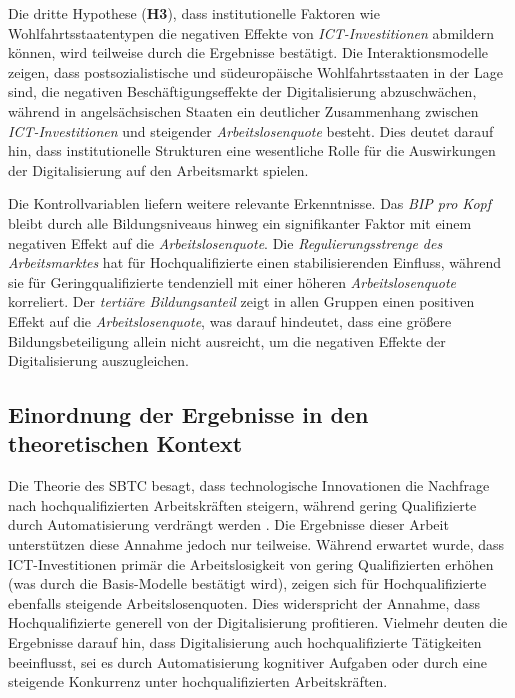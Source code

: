 Die dritte Hypothese (\textbf{H3}), dass institutionelle Faktoren wie Wohlfahrtsstaatentypen die 
negativen Effekte von \textit{\ac{ICT}-Investitionen} abmildern können, wird teilweise durch die 
Ergebnisse bestätigt. Die Interaktionsmodelle zeigen, dass postsozialistische und südeuropäische 
Wohlfahrtsstaaten in der Lage sind, die negativen Beschäftigungseffekte der Digitalisierung 
abzuschwächen, während in angelsächsischen Staaten ein deutlicher Zusammenhang zwischen 
\textit{\ac{ICT}-Investitionen} und steigender \textit{Arbeitslosenquote} besteht. Dies deutet 
darauf hin, dass institutionelle Strukturen eine wesentliche Rolle für die Auswirkungen der 
Digitalisierung auf den Arbeitsmarkt spielen.

Die Kontrollvariablen liefern weitere relevante Erkenntnisse. Das \textit{\ac{BIP} pro Kopf} 
bleibt durch alle Bildungsniveaus hinweg ein signifikanter Faktor mit einem negativen Effekt auf 
die \textit{Arbeitslosenquote}. Die \textit{Regulierungsstrenge des Arbeitsmarktes} hat für 
Hochqualifizierte einen stabilisierenden Einfluss, während sie für Geringqualifizierte 
tendenziell mit einer höheren \textit{Arbeitslosenquote} korreliert. Der 
\textit{tertiäre Bildungsanteil} zeigt in allen Gruppen einen positiven Effekt auf die 
\textit{Arbeitslosenquote}, was darauf hindeutet, dass eine größere Bildungsbeteiligung allein 
nicht ausreicht, um die negativen Effekte der Digitalisierung auszugleichen.


\subsection{Einordnung der Ergebnisse in den theoretischen Kontext}

Die Theorie des \ac{SBTC} besagt, dass technologische Innovationen die Nachfrage nach 
hochqualifizierten Arbeitskräften steigern, während gering Qualifizierte durch Automatisierung 
verdrängt werden \parencite[vgl.][S. 2–3]{violante2008skill}. Die Ergebnisse dieser Arbeit 
unterstützen diese Annahme jedoch nur teilweise. Während erwartet wurde, dass 
\ac{ICT}-Investitionen primär die Arbeitslosigkeit von gering Qualifizierten erhöhen (was durch 
die Basis-Modelle bestätigt wird), zeigen sich für Hochqualifizierte ebenfalls steigende 
Arbeitslosenquoten. Dies widerspricht der Annahme, dass Hochqualifizierte generell von der 
Digitalisierung profitieren. Vielmehr deuten die Ergebnisse darauf hin, dass Digitalisierung auch 
hochqualifizierte Tätigkeiten beeinflusst, sei es durch Automatisierung kognitiver Aufgaben oder 
durch eine steigende Konkurrenz unter hochqualifizierten Arbeitskräften.

